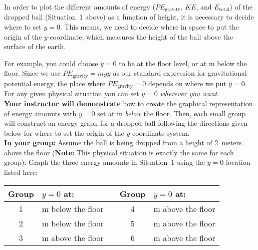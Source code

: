 In order to plot the different amounts of energy ($PE_\text{gravity}$, $KE$, and $E_\text{total}$) of the dropped ball (Situation~1 above) as a function of height, it is necessary to decide where to set $y = 0$. This means, we need to decide where in space to put the origin of the $y$-coordinate, which measures the height of the ball above the surface of the earth.

For example, you could choose $y = 0$ to be at the floor level, or at \unit[3]{m} below the floor. Since we use $PE_\text{gravity} = mgy$ as our standard expression for gravitational potential energy, the place where $PE_\text{gravity} = 0$ depends on where we put $y = 0$. For any given physical situation you can set $y = 0$ {\em wherever you want}.\\
	
\noindent\textbf{Your instructor will demonstrate} how to create the graphical representation of energy amounts with $y = 0$ set at \unit[3]{m} {\em below} the floor. Then, each small group will construct an energy graph for a dropped ball following the directions given below for where to set the origin of the $y$-coordinate system.\\

\label{act2.3.1-2} \noindent\textbf{In your group:} Assume the ball is being dropped from a height of 2~meters above the floor (\textbf{Note:} This physical situation is exactly the same for each group). Graph the three energy amounts in Situation~1 using the $y = 0$ location listed here:

\begin{center}
\begin{tabular}{clccl}
	\hline\hline
	Group	&	$y = 0$ at:	& &	Group	&	$y = 0$ at:\\
	\hline
	1	&	\unit[2]{m} below the floor	& &	4	&	\unit[2]{m} above the floor\\
	2	&	\unit[1]{m} below the floor	& &	5	&	\unit[3]{m} above the floor\\
	3	&	\unit[1]{m} above the floor	& &	6	&	\unit[4]{m} above the floor\\
	\hline\hline
\end{tabular}
\end{center}

